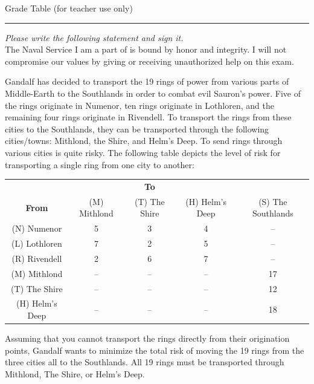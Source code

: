 \documentclass[12pt]{exam}
\begin{document}
\bigskip
\begin{center}
Grade Table (for teacher use only)\\
\addpoints
\gradetable[v][questions]
\end{center}

\noindent
\rule[2ex]{\textwidth}{2pt}

\emph{Please write the following statement and sign it.}\\
The Naval Service I am a part of is bound by honor
and integrity. I will not compromise our values by
giving or receiving unauthorized help on this exam.

\newpage %

\newpage

\begin{questions}


\question Gandalf has decided to transport the 19 rings of power from various parts of Middle-Earth to the Southlands in order to combat evil Sauron's power. Five of the rings originate in Numenor, ten rings originate in Lothloren, and the remaining four rings originate in Rivendell. To transport the rings from these cities to the Southlands, they can be transported through the following cities/towns: Mithlond, the Shire, and Helm's Deep. To send rings through various cities is quite risky. The following table depicts the level of risk for transporting a single ring from one city to another:
\begin{center}
\begin{tabular}{c|cccc}
 &  & \textbf{To} &  \\
\textbf{From} & (M) Mithlond& (T) The Shire &  (H) Helm's Deep & (S) The Southlands\\ \hline
(N) Numenor & 5 & 3 & 4 & --  \\
(L) Lothloren  & 7 & 2 & 5& --  \\
(R) Rivendell & 2 & 6 & 7& --  \\
(M) Mithlond & -- & -- & -- & 17 \\
(T) The Shire & -- & -- &  -- & 12 \\
(H) Helm's Deep & -- & -- & -- & 18
\end{tabular}
\end{center}

Assuming that you cannot transport the rings directly from their origination points, Gandalf wants to minimize the total risk of moving the 19 rings from the three cities all to the Southlands.  All 19 rings must be transported through Mithlond, The Shire, or Helm's Deep.


\end{questions}
\end{document}
